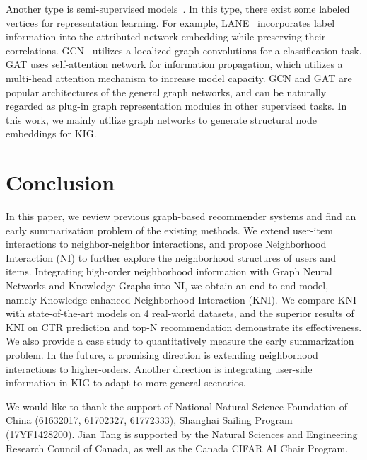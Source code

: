\documentclass[sigconf]{acmart}
\begin{document}
Another type is semi-supervised models~\cite{huang2017label, kipf2016semi, velickovic2017graph}. In this type, there exist some labeled vertices for representation learning. 
For example, 
LANE~\cite{huang2017label} incorporates label information into the attributed network embedding while preserving their correlations.
GCN~\cite{kipf2016semi} utilizes a localized graph convolutions for a classification task. 
GAT \cite{velickovic2017graph} uses self-attention network for information propagation, which utilizes a multi-head attention mechanism to increase model capacity.
GCN and GAT are popular architectures of the general graph networks, and can be naturally regarded as plug-in graph representation modules in other supervised tasks.
In this work, we mainly utilize graph networks to generate structural node embeddings for KIG.

\section{Conclusion} \label{sec:co}

In this paper, we review previous graph-based recommender systems and find an early summarization problem of the existing methods. 
We extend user-item interactions to neighbor-neighbor interactions, and propose Neighborhood Interaction (NI) to further explore the neighborhood structures of users and items.
Integrating high-order neighborhood information with Graph Neural Networks and Knowledge Graphs into NI, we obtain an end-to-end model, namely Knowledge-enhanced Neighborhood Interaction (KNI). We compare KNI with state-of-the-art models on 4 real-world datasets, and the superior results of KNI on CTR prediction and top-N recommendation demonstrate its effectiveness. We also provide a case study to quantitatively measure the early summarization problem. In the future, a promising direction is extending neighborhood interactions to higher-orders. Another direction is integrating user-side information in KIG to adapt to more general scenarios.

\begin{acks}
We would like to thank the support of National Natural Science Foundation of China (61632017, 61702327, 61772333), Shanghai Sailing Program (17YF1428200). Jian Tang is supported by the Natural Sciences and Engineering Research Council of Canada, as well as the Canada CIFAR AI Chair Program.
\end{acks}



\end{document}

